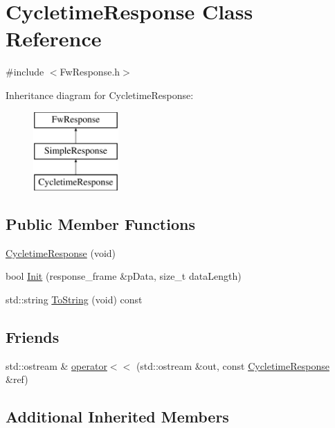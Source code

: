 \hypertarget{class_cycletime_response}{\section{Cycletime\-Response Class Reference}
\label{class_cycletime_response}
}


{\ttfamily \#include $<$Fw\-Response.\-h$>$}

Inheritance diagram for Cycletime\-Response\-:\begin{figure}[H]
\begin{center}
\leavevmode
\includegraphics[height=3.000000cm]{class_cycletime_response}
\end{center}
\end{figure}
\subsection*{Public Member Functions}
\begin{DoxyCompactItemize}
\item 
\hyperlink{class_cycletime_response_a6f8a0c12dadb460e3c1fb1bdb7895e7b}{Cycletime\-Response} (void)
\item 
bool \hyperlink{class_cycletime_response_ac9ffd7b19849712f9fd6b9b9db1ae322}{Init} (response\-\_\-frame \&p\-Data, size\-\_\-t data\-Length)
\item 
std\-::string \hyperlink{class_cycletime_response_a1bd4a1044d4c0a5d376b71735454425d}{To\-String} (void) const 
\end{DoxyCompactItemize}
\subsection*{Friends}
\begin{DoxyCompactItemize}
\item 
std\-::ostream \& \hyperlink{class_cycletime_response_a297451ca9509cdee481811027a5e31a6}{operator$<$$<$} (std\-::ostream \&out, const \hyperlink{class_cycletime_response}{Cycletime\-Response} \&ref)
\end{DoxyCompactItemize}
\subsection*{Additional Inherited Members}


